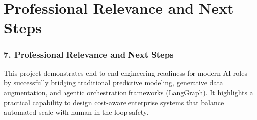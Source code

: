 \documentclass[xcolor={dvipsnames,svgnames,table}]{beamer}
\begin{document}


\section{Professional Relevance and Next Steps}
\begin{frame}
	\frametitle{7. Professional Relevance and Next Steps}
%
%
This project demonstrates end-to-end engineering readiness for modern AI roles by successfully bridging traditional predictive modeling, generative data augmentation, and agentic orchestration frameworks (LangGraph). It highlights a practical capability to design cost-aware enterprise systems that balance automated scale with human-in-the-loop safety.
\end{frame}
\end{document}
